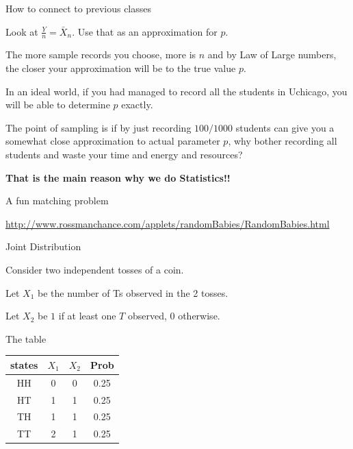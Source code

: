 \documentclass{beamer}\usepackage[]{graphicx}\usepackage[]{color}
\begin{document}
\begin{frame}[fragile]{How to connect to previous classes \;\;}

Look at $ \frac{Y}{n} = \bar{X}_{n}$. Use that as an approximation for $p$. \pause \newline

The more sample records you choose, more is $n$ and by Law of Large numbers, the closer your approximation will be to the true value $p$. \pause \newline

In an ideal world, if you had managed to record all the students in Uchicago, you will be able to determine $p$ exactly. \pause \newline

The point of sampling is if by just recording $100/1000$ students can give you a somewhat close approximation to actual parameter $p$, why bother recording all students and waste your time and energy and resources? \pause \newline

\textbf{That is the main reason why we do Statistics!!}

\end{frame}


\begin{frame}[fragile]{A fun matching problem \;\;}

\url{http://www.rossmanchance.com/applets/randomBabies/RandomBabies.html}

\end{frame}

\begin{frame}[fragile]{Joint Distribution \;\;}

Consider two independent tosses of a coin. \newline

Let $X_1$ be the number of Ts observed in the 2 tosses. \newline

Let $X_2$ be $1$ if at least one $T$ observed, $0$ otherwise. \pause \newline

The table

\begin{tabular}{|c|c|c|c|}
\hline
states & $X_1$ & $X_2$ & Prob \\ \hline
HH & 0 & 0 & 0.25 \\ \hline
HT & 1 & 1 & 0.25 \\ \hline
TH & 1 & 1 & 0.25 \\ \hline
TT & 2 & 1 & 0.25 \\ \hline
\end{tabular}

\end{frame}
\end{document}
